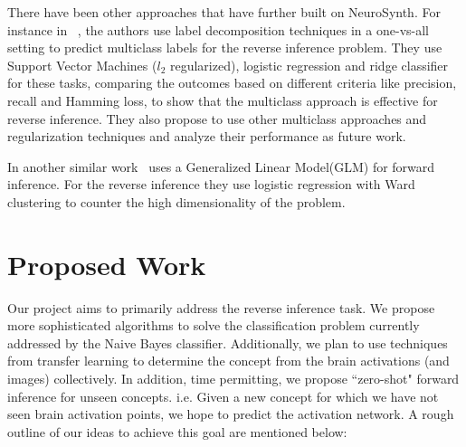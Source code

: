 \documentclass[11pt]{article}
\begin{document}
There have been other approaches that have further built on NeuroSynth. For instance in ~\cite{sanmi2013multi}, the authors use label decomposition techniques in a one-vs-all setting to predict multiclass labels for the reverse inference problem. They use Support Vector Machines ($l_2$ regularized), logistic regression and ridge classifier for these tasks,  comparing the outcomes based on different criteria like precision, recall and Hamming loss, to show that the multiclass approach is effective for reverse inference. They also propose to use other multiclass approaches and regularization techniques and analyze their performance as future work. 

In another similar work~\cite{schwartz2013mapping} uses a Generalized Linear Model(GLM) for forward inference. For the reverse inference they use logistic regression with Ward clustering to counter the high dimensionality of the problem. 





\section{Proposed Work}

Our project aims to primarily address the reverse inference task. We propose more sophisticated algorithms to solve the classification problem currently addressed by the Naive Bayes classifier. Additionally, we plan to use techniques from transfer learning to determine the concept from the brain activations (and images) collectively. In addition, time permitting, we propose ``zero-shot" forward inference for unseen concepts. i.e. Given a new concept for which we have not seen brain activation points, we hope to predict the activation network. A rough outline of our ideas to achieve this goal are mentioned below:
\end{document}
